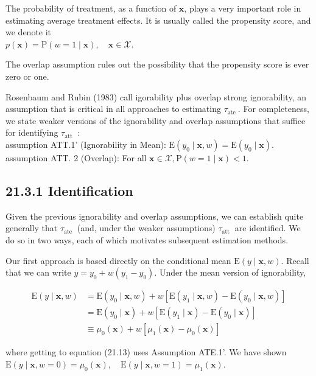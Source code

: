 \documentclass[10pt]{article}
\begin{document}
The probability of treatment, as a function of $\mathbf{x}$, plays a very important role in estimating average treatment effects. It is usually called the propensity score, and we denote it\\
$p(\mathbf{x})=\mathrm{P}(w=1 \mid \mathbf{x}), \quad \mathbf{x} \in \mathscr{X}$.

The overlap assumption rules out the possibility that the propensity score is ever zero or one.

Rosenbaum and Rubin (1983) call igorability plus overlap strong ignorability, an assumption that is critical in all approaches to estimating $\tau_{\text {ate }}$. For completeness, we state weaker versions of the ignorability and overlap assumptions that suffice for identifying $\tau_{\text {att }}$ :\\
assumption ATT.1' (Ignorability in Mean): $\mathrm{E}\left(y_{0} \mid \mathbf{x}, w\right)=\mathrm{E}\left(y_{0} \mid \mathbf{x}\right)$.\\
assumption ATT. 2 (Overlap): For all $\mathbf{x} \in \mathscr{X}, \mathrm{P}(w=1 \mid \mathbf{x})<1$.

\subsection*{21.3.1 Identification}
Given the previous ignorability and overlap assumptions, we can establish quite generally that $\tau_{\text {ate }}$ (and, under the weaker assumptions) $\tau_{\text {att }}$ are identified. We do so in two ways, each of which motivates subsequent estimation methods.

Our first approach is based directly on the conditional mean $\mathrm{E}(y \mid \mathbf{x}, w)$. Recall that we can write $y=y_{0}+w\left(y_{1}-y_{0}\right)$. Under the mean version of ignorability,


\begin{align*}
\mathrm{E}(y \mid \mathbf{x}, w) & =\mathrm{E}\left(y_{0} \mid \mathbf{x}, w\right)+w\left[\mathrm{E}\left(y_{1} \mid \mathbf{x}, w\right)-\mathrm{E}\left(y_{0} \mid \mathbf{x}, w\right)\right] \\
& =\mathrm{E}\left(y_{0} \mid \mathbf{x}\right)+w\left[\mathrm{E}\left(y_{1} \mid \mathbf{x}\right)-\mathrm{E}\left(y_{0} \mid \mathbf{x}\right)\right] \\
& \equiv \mu_{0}(\mathbf{x})+w\left[\mu_{1}(\mathbf{x})-\mu_{0}(\mathbf{x})\right] \tag{21.13}
\end{align*}


where getting to equation (21.13) uses Assumption ATE.1'. We have shown\\
$\mathrm{E}(y \mid \mathbf{x}, w=0)=\mu_{0}(\mathbf{x}), \quad \mathrm{E}(y \mid \mathbf{x}, w=1)=\mu_{1}(\mathbf{x})$.
\end{document}
